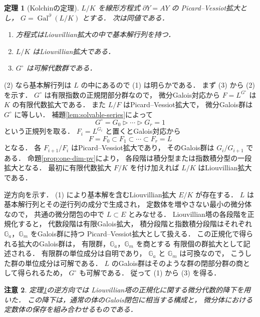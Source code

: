 \documentclass[a5paper,10pt,onecolumn]{jsarticle}
\makeatletter
\theoremstyle{mathnotetheorem}
\newtheorem{theorem}{定理}[section]
\newtheorem{remark}[theorem]{注意}
\renewcommand{\proofname}{証明}
\renewenvironment{proof}[1][\proofname]{%
  \par\pushQED{\qed}\normalfont\topsep4\p@\@plus2\p@\relax
  \trivlist\item[\hskip\labelsep\bfseries #1]\ignorespaces
}{\popQED\endtrivlist\@endpefalse}
\makeatother
\begin{document}
\begin{theorem}[Kolchinの定理]\label{thm:kolchin}
$L/K$ を線形方程式 $\partial Y=AY$ の
Picard--Vessiot拡大とし，
$G=\operatorname{Gal}^\partial(L/K)$ とする．
次は同値である．
\begin{enumerate}
\item 方程式はLiouvillian拡大の中で基本解行列を持つ．
\item $L/K$ はLiouvillian拡大である．
\item $G^\circ$ は可解代数群である．
\end{enumerate}
\end{theorem}
\begin{proof}
(2) なら基本解行列は $L$ の中にあるので (1) は明らかである．
まず (3) から (2) を示す．
$G^\circ$ は有限指数の正規閉部分群なので，
微分Galois対応から
$F=L^{G^\circ}$ は $K$ の有限代数拡大である．
また $L/F$ はPicard--Vessiot拡大で，
微分Galois群は $G^\circ$ に等しい．
補題\ref{lem:solvable-series}によって
\[
 G^\circ=G_0\triangleright\cdots\triangleright G_r=1
\]
という正規列を取る．
$F_i=L^{G_i}$ と置くとGalois対応から
\[
 F=F_0\subset F_1\subset\cdots\subset F_r=L
\]
となる．
各 $F_{i+1}/F_i$ はPicard--Vessiot拡大であり，
そのGalois群は $G_i/G_{i+1}$ である．
命題\ref{prop:one-dim-pv}により，
各段階は積分型または指数積分型の一段拡大となる．
最初に有限代数拡大 $F/K$ を付け加えれば
$L/K$ はLiouvillian拡大である．

逆方向を示す．
(1) により基本解を含むLiouvillian拡大 $E/K$ が存在する．
$L$ は基本解行列とその逆行列の成分で生成され，
定数体を増やさない最小の微分体なので，
共通の微分閉包の中で $L\subset E$ とみなせる．
Liouvillian塔の各段階を正規化すると，
代数段階は有限Galois拡大，
積分段階と指数積分段階はそれぞれ
$\mathbb G_a$，$\mathbb G_m$ をGalois群に持つ
Picard--Vessiot拡大として扱える．
この正規化で得られる拡大のGalois群は，
有限群，$\mathbb G_a$，$\mathbb G_m$ を商とする
有限個の群拡大として記述される．
有限群の単位成分は自明であり，
$\mathbb G_a$ と $\mathbb G_m$ は可換なので，
こうした群の単位成分は可解である．
$L$ のGalois群はそのような群の閉部分群の商として得られるため，
$G^\circ$ も可解である．
従って (1) から (3) を得る．
\end{proof}

\begin{remark}
定理\ref{thm:kolchin}の逆方向では
Liouvillian塔の正規化に関する微分代数的降下を用いた．
この降下は，通常の体のGalois閉包に相当する構成と，
微分体における定数体の保存を組み合わせるものである．
\end{remark}
\end{document}

